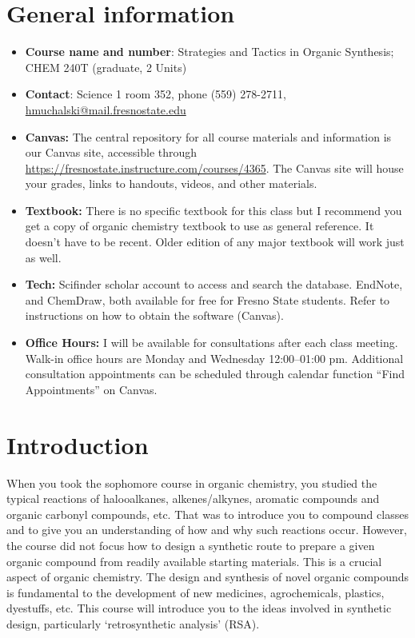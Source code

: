 \hypertarget{general-information}{%
\section{General information}\label{general-information}}

\begin{itemize}
\tightlist
\item
  \textbf{Course name and number}: Strategies and Tactics in Organic
  Synthesis; CHEM 240T (graduate, 2 Units)
\item
  \textbf{Contact}: Science 1 room 352, phone (559) 278-2711,
  \url{hmuchalski@mail.fresnostate.edu}
\item
  \textbf{Canvas:} The central repository for all course materials and
  information is our Canvas site, accessible through
  \url{https://fresnostate.instructure.com/courses/4365}. The Canvas
  site will house your grades, links to handouts, videos, and other
  materials.
\item
  \textbf{Textbook:} There is no specific textbook for this class but I
  recommend you get a copy of organic chemistry textbook to use as
  general reference. It doesn't have to be recent. Older edition of any
  major textbook will work just as well.
\item
  \textbf{Tech:} Scifinder scholar account to access and search the
  database. EndNote, and ChemDraw, both available for free for Fresno
  State students. Refer to instructions on how to obtain the software
  (Canvas).
\item
  \textbf{Office Hours:} I will be available for consultations after
  each class meeting. Walk-in office hours are Monday and Wednesday
  12:00--01:00 pm. Additional consultation appointments can be scheduled
  through calendar function ``Find Appointments'' on Canvas.
\end{itemize}

\hypertarget{introduction}{%
\section{Introduction}\label{introduction}}

When you took the sophomore course in organic chemistry, you studied the
typical reactions of halooalkanes, alkenes/alkynes, aromatic compounds
and organic carbonyl compounds, etc. That was to introduce you to
compound classes and to give you an understanding of how and why such
reactions occur. However, the course did not focus how to design a
synthetic route to prepare a given organic compound from readily
available starting materials. This is a crucial aspect of organic
chemistry. The design and synthesis of novel organic compounds is
fundamental to the development of new medicines, agrochemicals,
plastics, dyestuffs, etc. This course will introduce you to the ideas
involved in synthetic design, particularly `retrosynthetic analysis'
(RSA).

